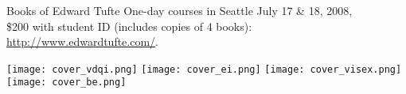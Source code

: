 \documentclass[12pt,mathserif]{beamer}
\begin{document}
\begin{frame}
{Books of Edward Tufte}
One-day courses in Seattle July 17 \& 18, 2008,\\ \$200 with student ID (includes copies of 4 books): \\ \url{http://www.edwardtufte.com/}.

\texttt{[image: cover\_vdqi.png]}
\texttt{[image: cover\_ei.png]}
\texttt{[image: cover\_visex.png]}
\hspace{.1in}
\texttt{[image: cover\_be.png]}

\end{frame}
\end{document}
